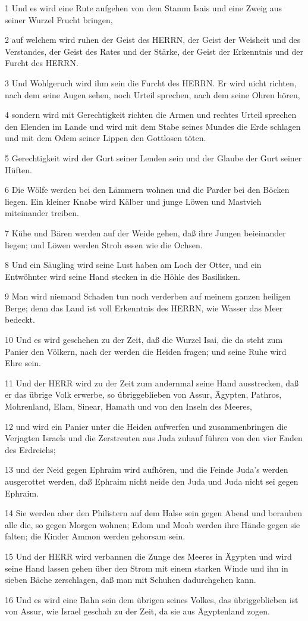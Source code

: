 \par 1 Und es wird eine Rute aufgehen von dem Stamm Isais und eine Zweig aus seiner Wurzel Frucht bringen,
\par 2 auf welchem wird ruhen der Geist des HERRN, der Geist der Weisheit und des Verstandes, der Geist des Rates und der Stärke, der Geist der Erkenntnis und der Furcht des HERRN.
\par 3 Und Wohlgeruch wird ihm sein die Furcht des HERRN. Er wird nicht richten, nach dem seine Augen sehen, noch Urteil sprechen, nach dem seine Ohren hören,
\par 4 sondern wird mit Gerechtigkeit richten die Armen und rechtes Urteil sprechen den Elenden im Lande und wird mit dem Stabe seines Mundes die Erde schlagen und mit dem Odem seiner Lippen den Gottlosen töten.
\par 5 Gerechtigkeit wird der Gurt seiner Lenden sein und der Glaube der Gurt seiner Hüften.
\par 6 Die Wölfe werden bei den Lämmern wohnen und die Parder bei den Böcken liegen. Ein kleiner Knabe wird Kälber und junge Löwen und Mastvieh miteinander treiben.
\par 7 Kühe und Bären werden auf der Weide gehen, daß ihre Jungen beieinander liegen; und Löwen werden Stroh essen wie die Ochsen.
\par 8 Und ein Säugling wird seine Lust haben am Loch der Otter, und ein Entwöhnter wird seine Hand stecken in die Höhle des Basilisken.
\par 9 Man wird niemand Schaden tun noch verderben auf meinem ganzen heiligen Berge; denn das Land ist voll Erkenntnis des HERRN, wie Wasser das Meer bedeckt.
\par 10 Und es wird geschehen zu der Zeit, daß die Wurzel Isai, die da steht zum Panier den Völkern, nach der werden die Heiden fragen; und seine Ruhe wird Ehre sein.
\par 11 Und der HERR wird zu der Zeit zum andernmal seine Hand ausstrecken, daß er das übrige Volk erwerbe, so übriggeblieben von Assur, Ägypten, Pathros, Mohrenland, Elam, Sinear, Hamath und von den Inseln des Meeres,
\par 12 und wird ein Panier unter die Heiden aufwerfen und zusammenbringen die Verjagten Israels und die Zerstreuten aus Juda zuhauf führen von den vier Enden des Erdreichs;
\par 13 und der Neid gegen Ephraim wird aufhören, und die Feinde Juda's werden ausgerottet werden, daß Ephraim nicht neide den Juda und Juda nicht sei gegen Ephraim.
\par 14 Sie werden aber den Philistern auf dem Halse sein gegen Abend und berauben alle die, so gegen Morgen wohnen; Edom und Moab werden ihre Hände gegen sie falten; die Kinder Ammon werden gehorsam sein.
\par 15 Und der HERR wird verbannen die Zunge des Meeres in Ägypten und wird seine Hand lassen gehen über den Strom mit einem starken Winde und ihn in sieben Bäche zerschlagen, daß man mit Schuhen dadurchgehen kann.
\par 16 Und es wird eine Bahn sein dem übrigen seines Volkes, das übriggeblieben ist von Assur, wie Israel geschah zu der Zeit, da sie aus Ägyptenland zogen.

